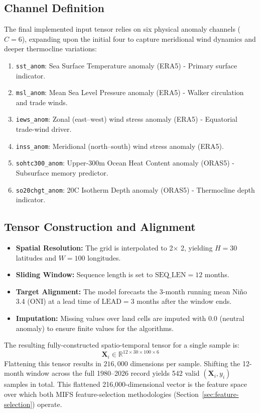 \subsection{Channel Definition}
The final implemented input tensor relies on six physical anomaly channels ($C=6$), expanding upon the initial four to capture meridional wind dynamics and deeper thermocline variations:
\begin{enumerate}
\item \texttt{sst\_anom}: Sea Surface Temperature anomaly (ERA5) - Primary surface indicator.
\item \texttt{msl\_anom}: Mean Sea Level Pressure anomaly (ERA5) - Walker circulation and trade winds.
\item \texttt{iews\_anom}: Zonal (east–west) wind stress anomaly (ERA5) - Equatorial trade-wind driver.
\item \texttt{inss\_anom}: Meridional (north–south) wind stress anomaly (ERA5).
\item \texttt{sohtc300\_anom}: Upper-300m Ocean Heat Content anomaly (ORAS5) - Subsurface memory predictor.
\item \texttt{so20chgt\_anom}: 20\degree C Isotherm Depth anomaly (ORAS5) - Thermocline depth indicator.
\end{enumerate}

\subsection{Tensor Construction and Alignment}
\begin{itemize}
\item \textbf{Spatial Resolution:} The grid is interpolated to 2\degree $\times$ 2\degree, yielding $H=30$ latitudes and $W=100$ longitudes.
\item \textbf{Sliding Window:} Sequence length is set to $\text{SEQ\_LEN} = 12$ months.
\item \textbf{Target Alignment:} The model forecasts the 3-month running mean Ni\~{n}o 3.4 (ONI) at a lead time of $\text{LEAD} = 3$ months after the window ends.
\item \textbf{Imputation:} Missing values over land cells are imputed with $0.0$ (neutral anomaly) to ensure finite values for the algorithms.
\end{itemize}
The resulting fully-constructed spatio-temporal tensor for a single sample is:
\begin{equation}
\mathbf{X}_i \in \mathbb{R}^{12 \times 30 \times 100 \times 6}
\end{equation}
Flattening this tensor results in $216,000$ dimensions per sample. Shifting the 12-month window across the full 1980--2026 record yields 542 valid $(\mathbf{X}_i, y_i)$ samples in total. This flattened 216,000-dimensional vector is the feature space over which both MIFS feature-selection methodologies (Section~\ref{sec:feature-selection}) operate.


